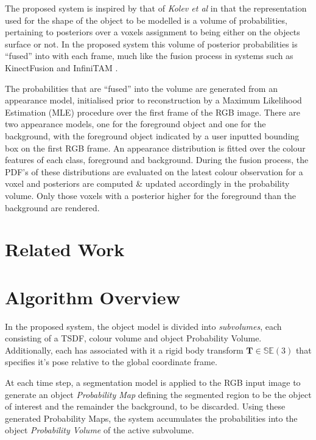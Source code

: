The proposed system is inspired by that of \textit{Kolev et al} \cite{Kolev2006} 
in that the representation used for the shape of the object to be modelled is a 
volume of probabilities, pertaining to posteriors over a voxels assignment to 
being either on the objects surface or not. In the proposed system this volume 
of posterior probabilities is ``fused'' into with each frame, much like the 
fusion process in systems such as KinectFusion \cite{Newcombe2011} and 
InfiniTAM \cite{Prisacariu2014}.

The probabilities that are ``fused'' into the volume are generated from an
appearance model, initialised prior to reconstruction by a Maximum Likelihood 
Estimation (MLE) \cite{BishopPRML} procedure over the first frame of the RGB image. 
There are two appearance models, one for the foreground object and one for the 
background, with the foreground object indicated by a user inputted bounding box 
on the first RGB frame. An appearance distribution is fitted over the colour features 
of each class, foreground and background. During the fusion process, the PDF's of 
these distributions are evaluated on the latest colour observation for a voxel and 
posteriors are computed \& updated accordingly in the probability volume. Only 
those voxels with a posterior higher for the foreground than the background 
are rendered.

\section{Related Work}
\label{sec:probobj_related_work}

\section{Algorithm Overview}
In the proposed system, the object model is divided into \textit{subvolumes}, 
each consisting of a TSDF, colour volume and object Probability Volume. 
Additionally, each has associated with it a rigid body transform 
$\mathbf{T} \in \mathbb{SE}(3)$ that specifies it's pose relative to the global 
coordinate frame.

At each time step, a segmentation model is applied to the RGB input image to
generate an object \textit{Probability Map} defining the segmented region to be
the object of interest and the remainder the background, to be discarded. Using
these generated Probability Maps, the system accumulates the probabilities into
the object \textit{Probability Volume} of the active subvolume.


